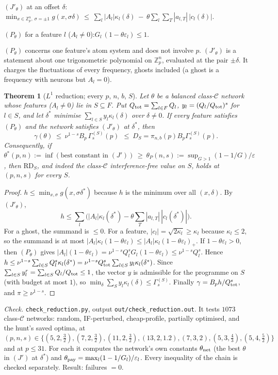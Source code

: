 \documentclass[11pt]{article}
\newtheorem{theorem}{Theorem}
\theoremstyle{remark}
\begin{document}
\medskip\noindent$(J'_\theta)$ at an offset $\delta$:\quad
$\displaystyle \min_{x\in\mathbb Z_p^n,\ \sigma=\pm1} g(x,\sigma\delta)\ \le\ \sum_l|A_l|\kappa_l(\delta)\ -\ \theta\sum_{l}\sum_{T}|a_{l,T}|\,|c_l(\delta)|.$

\smallskip\noindent$(P_\theta)$ for a feature $l$ ($A_l\neq0$):\quad $G_l\,(1-\theta\varepsilon_l)\le1$.

\medskip\noindent
$(P_\theta)$ concerns one feature's atom system and does not involve $p$.  $(J'_\theta)$ is a statement about one trigonometric
polynomial on $\mathbb Z_p^n$, evaluated at the pair $\pm\delta$.  It charges the fluctuations of every frequency, ghosts included
(a ghost is a frequency with neurons but $A_l=0$).

\begin{theorem}[$L^1$ reduction; every $p$, $n$, $b$, $S$]\label{thm:red}
Let $\theta$ be a balanced class-$\mathcal C$ network whose features ($A_l\ne0$) lie in $S\subseteq F$.  Put $Q_{\rm tot}=\sum_{l\in F}Q_l$,
$y_l=(Q_l/Q_{\rm tot})^s$ for $l\in S$, and let $\delta^\ast$ minimise $\sum_{l\in S}y_l\kappa_l(\delta)$ over $\delta\ne0$.
If every feature satisfies $(P_\theta)$ and the network satisfies $(J'_\theta)$ at $\delta^\ast$, then
\[\gamma(\theta)\ \le\ \nu^{1-s}B_p\,\Gamma^{(S)}_s(p)\ \ \le\ D_S=\pi_{n,b}(p)B_p\Gamma^{(S)}_s(p).\]
Consequently, if $\theta^\ast(p,n):=\inf(\text{best constant in }(J'))\ \ge\ \theta_P(n,s):=\sup_{G>1}(1-1/G)/\varepsilon$, then
$\mathrm{RD}_S$, and indeed the class-$\mathcal C$ interference-free value on $S$, holds at $(p,n,s)$ for every $S$.
\end{theorem}
\begin{proof}
$h\le\min_{x,\sigma}g(x,\sigma\delta^\ast)$ because $h$ is the minimum over all $(x,\delta)$.  By $(J'_\theta)$,
\[h\le\sum_l\Big(|A_l|\kappa_l(\delta^\ast)-\theta\sum_T|a_{l,T}|\,|c_l(\delta^\ast)|\Big).\]
For a ghost, the summand is $\le0$.  For a feature, $|c_l|=\sqrt{2\kappa_l}\ge\kappa_l$ because $\kappa_l\le2$, so the summand is at most
$|A_l|\kappa_l(1-\theta\varepsilon_l)\le|A_l|\kappa_l(1-\theta\varepsilon_l)_+$.
If $1-\theta\varepsilon_l>0$, then $(P_\theta)$ gives $|A_l|(1-\theta\varepsilon_l)=\nu^{1-s}Q_l^sG_l(1-\theta\varepsilon_l)\le\nu^{1-s}Q_l^s$.
Hence $h\le\nu^{1-s}\sum_{l\in S}Q_l^s\kappa_l(\delta^\ast)=\nu^{1-s}Q_{\rm tot}^s\sum_{l\in S}y_l\kappa_l(\delta^\ast)$.
Since $\sum_{l\in S}y_l^r=\sum_{l\in S}Q_l/Q_{\rm tot}\le1$, the vector $y$ is admissible for the programme on $S$ (with budget at most $1$), so
$\min_\delta\sum_Sy_l\kappa_l(\delta)\le\Gamma^{(S)}_s$.  Finally $\gamma=B_ph/Q_{\rm tot}^s$, and $\pi\ge\nu^{1-s}$.
\end{proof}
\emph{Check.} \texttt{check\_reduction.py}, output \texttt{out/check\_reduction.out}.  It tests $1073$ class-$\mathcal C$ networks: random, IF-perturbed,
cheap-profile, partially optimised, and the hunt's saved optima, at $(p,n,s)\in\{(5,2,\frac32),(7,2,\frac32),(11,2,\frac32),(13,2,1.2),(7,3,2),(5,3,\frac43),(5,4,\frac52)\}$
and at $p\le31$.  For each it computes the network's own constants
$\theta_{\rm net}$ (the best $\theta$ in $(J')$ at $\delta^\ast$) and $\theta_{\rm pay}=\max_l(1-1/G_l)/\varepsilon_l$.  Every
inequality of the chain is checked separately.  Result: failures $=0$.
\end{document}
